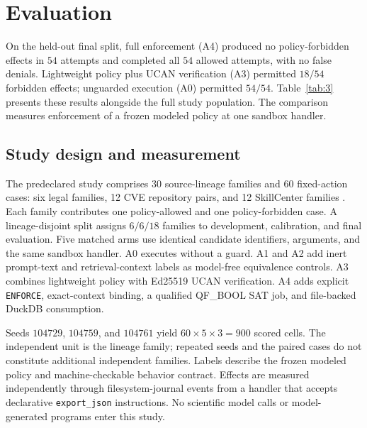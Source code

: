 \section{Evaluation}
\label{sec:eval}

On the held-out final split, full enforcement (A4) produced no policy-forbidden effects in $54$ attempts and completed all $54$ allowed attempts, with no false denials. Lightweight policy plus UCAN verification (A3) permitted $18/54$ forbidden effects; unguarded execution (A0) permitted $54/54$. Table~\ref{tab:3} presents these results alongside the full study population. The comparison measures enforcement of a frozen modeled policy at one sandbox handler.

\subsection{Study design and measurement}
\label{sec:eval-protocol}

The predeclared study comprises $30$ source-lineage families and $60$ fixed-action cases: six legal families, 12 CVE repository pairs, and 12 SkillCenter families \citep{cvefixes}. Each family contributes one policy-allowed and one policy-forbidden case. A lineage-disjoint split assigns $6/6/18$ families to development, calibration, and final evaluation. Five matched arms use identical candidate identifiers, arguments, and the same sandbox handler. A0 executes without a guard. A1 and A2 add inert prompt-text and retrieval-context labels as model-free equivalence controls. A3 combines lightweight policy with Ed25519 UCAN verification. A4 adds explicit \texttt{ENFORCE}, exact-context binding, a qualified QF\_BOOL SAT job, and file-backed DuckDB consumption.

Seeds $104729$, $104759$, and $104761$ yield $60\times5\times3=900$ scored cells. The independent unit is the lineage family; repeated seeds and the paired cases do not constitute additional independent families. Labels describe the frozen modeled policy and machine-checkable behavior contract. Effects are measured independently through filesystem-journal events from a handler that accepts declarative \texttt{export\_json} instructions. No scientific model calls or model-generated programs enter this study.

